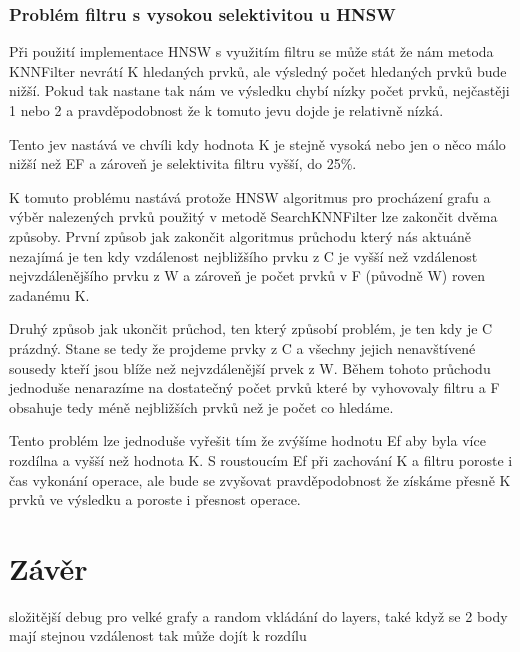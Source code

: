 \documentclass[czech,semestral,dept460,male,csharp,cpdeclaration]{diploma}
\begin{document}
		\subsection{Problém filtru s vysokou selektivitou u HNSW}
		
			Při použití implementace HNSW s využitím filtru se může stát že nám metoda KNNFilter nevrátí K hledaných prvků, ale výsledný počet hledaných prvků bude nižší. Pokud tak nastane tak nám ve výsledku chybí nízky počet prvků, nejčastěji 1 nebo 2 a pravděpodobnost že k tomuto jevu dojde je relativně nízká.
			
			Tento jev nastává ve chvíli kdy hodnota K je stejně vysoká nebo jen o něco málo nižší než EF a zároveň je selektivita filtru vyšší, do 25\%.
			
			K tomuto problému nastává protože HNSW algoritmus pro procházení grafu a výběr nalezených prvků použitý v metodě SearchKNNFilter lze zakončit dvěma způsoby. První způsob jak zakončit algoritmus průchodu který nás aktuáně nezajímá je ten kdy vzdálenost nejbližšího prvku z C je vyšší než vzdálenost nejvzdálenějšího prvku z W a zároveň je počet prvků v F (původně W) roven zadanému K.
			
			Druhý způsob jak ukončit průchod, ten který způsobí problém, je ten kdy je C prázdný. Stane se tedy že projdeme prvky z C a všechny jejich nenavštívené sousedy kteří jsou blíže než nejvzdálenější prvek z W. Během tohoto průchodu jednoduše nenarazíme na dostatečný počet prvků které by vyhovovaly filtru a F obsahuje tedy méně nejbližších prvků než je počet co hledáme.
			
			Tento problém lze jednoduše vyřešit tím že zvýšíme hodnotu Ef aby byla více rozdílna a vyšší než hodnota K. S roustoucím Ef při zachování K a filtru poroste i čas vykonání operace, ale bude se zvyšovat pravděpodobnost že získáme přesně K prvků ve výsledku a poroste i přesnost operace.
	
	\chapter{Závěr}
	
		složitější debug pro velké grafy a random vkládání do layers, také když se 2 body mají stejnou vzdálenost tak může dojít k rozdílu
	
	\nocite{*}
	
	\printbibliography[title={Literatura}, heading=bibintoc]
	
\end{document}
